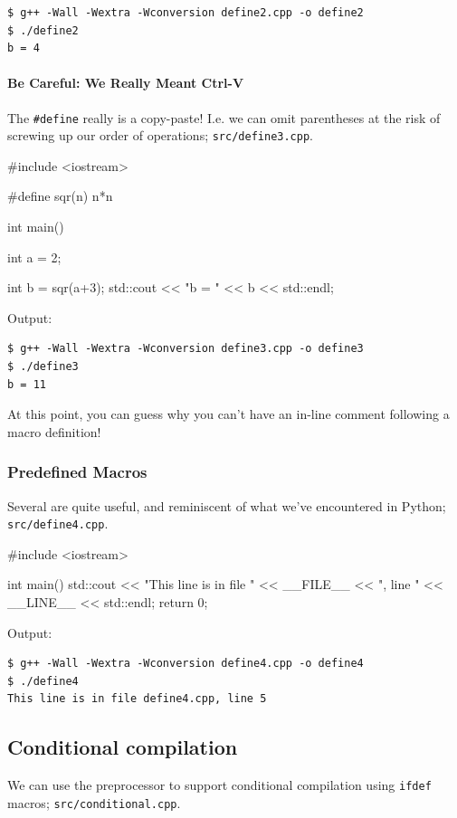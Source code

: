 \documentclass[12pt,letterpaper,twoside]{article}
\begin{document}
\begin{verbatim}
$ g++ -Wall -Wextra -Wconversion define2.cpp -o define2
$ ./define2
b = 4
\end{verbatim}

\paragraph{Be Careful: We Really Meant Ctrl-V} The \texttt{\#define} really is a 
copy-paste! I.e. we can omit parentheses at the risk of screwing up our order of operations;
\texttt{src/define3.cpp}.

\begin{cpp}
#include <iostream>

#define sqr(n) n*n

int main() {
  int a = 2;

  int b = sqr(a+3);
  std::cout << "b = " << b << std::endl;
}
\end{cpp}

Output:

\begin{verbatim}
$ g++ -Wall -Wextra -Wconversion define3.cpp -o define3
$ ./define3
b = 11
\end{verbatim}

At this point, you can guess why you can't have an in-line comment following a macro definition!

\subsubsection{Predefined Macros} Several are quite useful, and reminiscent of what we've
encountered in Python;
\texttt{src/define4.cpp}.

\begin{cpp}
#include <iostream>

int main() {
  std::cout << "This line is in file " << __FILE__
            << ", line " << __LINE__ << std::endl;
  return 0;
}
\end{cpp}

Output:

\begin{verbatim}
$ g++ -Wall -Wextra -Wconversion define4.cpp -o define4
$ ./define4
This line is in file define4.cpp, line 5
\end{verbatim}

\subsection{Conditional compilation}
We can use the preprocessor to support conditional compilation using \texttt{ifdef} macros;
\texttt{src/conditional.cpp}.
\end{document}
